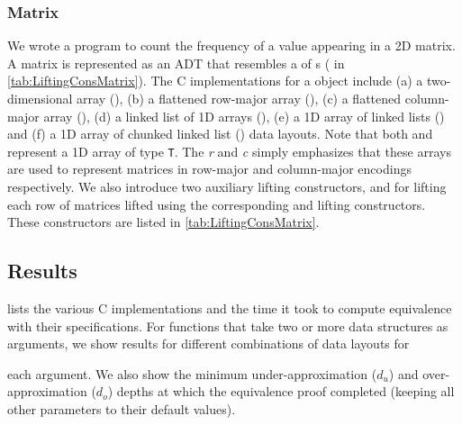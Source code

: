 
\vspace{-10px}
\subsubsection{Matrix}
We wrote a
\SpecL{} program to count the frequency of a value appearing in a 2D matrix.
A matrix is represented as an ADT that resembles a  of s ( in \cref{tab:LiftingConsMatrix}).
The C implementations for a  object include
(a) a two-dimensional array (), (b) a flattened row-major array (),
(c) a flattened column-major array (), (d) a linked list of 1D arrays (),
(e) a 1D array of linked lists () and (f) a 1D array of chunked linked list ()
data layouts. Note that both  and  represent a 1D array of type {\tt T}. The {\em r} and {\em c} simply
emphasizes that these arrays are used to represent matrices in row-major and column-major encodings respectively.
We also introduce two auxiliary lifting constructors,  and 
for lifting each row of matrices lifted using the corresponding  and   lifting
constructors. These constructors are listed in \cref{tab:LiftingConsMatrix}.
\subsection{Results}
 lists the various C implementations and the time it took
to compute equivalence with their specifications. For functions that
take two or more data structures as arguments, we show
results for different combinations of data layouts for {\parfillskip=0pt\par}

\noindent each argument.
We also show the minimum under-approximation ($d_u$) and over-approximation ($d_o$) depths
at which the equivalence proof completed (keeping all other parameters to their
default values).
